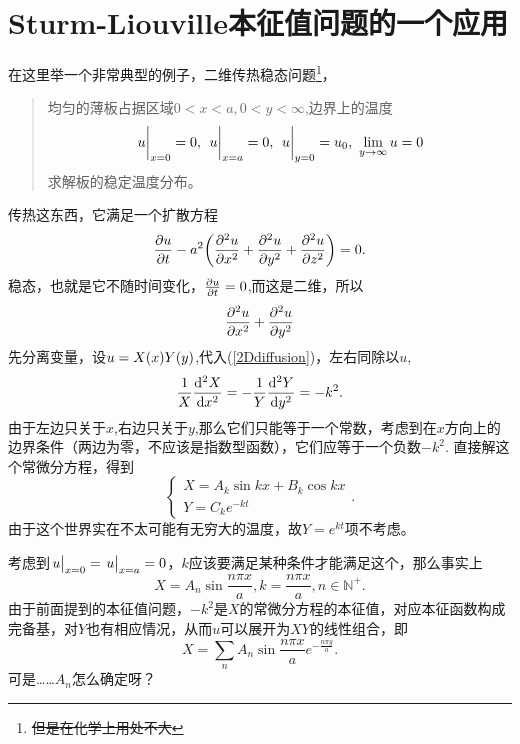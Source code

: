 \documentclass[12pt,a4paper,openany,twoside]{book}
\numberwithin{equation}{section}
\begin{document}
      \section{Sturm-Liouville本征值问题的一个应用}
        \label{sturm_Liouville_eigenvalue_problem_application}
        在这里举一个非常典型的例子，二维传热稳态问题\footnote{\sout{但是在化学上用处不大}}，
        \begin{quote}
          均匀的薄板占据区域$0<x<a,0<y<\infty$,边界上的温度
          \begin{equation*}
            \eval{u}_{x=0}=0,\ \eval{u}_{x=a}=0,\ \eval{u}_{y=0}=u_0,\ \lim_{y\to\infty}u=0
          \end{equation*} 
          求解板的稳定温度分布。
        \end{quote}
        传热这东西，它满足一个扩散方程
        \begin{equation}
          \pdv{u}{t}-a^2\qty(\pdv[2]{u}{x}+\pdv[2]{u}{y}+\pdv[2]{u}{z})=0.
        \end{equation}
        稳态，也就是它不随时间变化，$\pdv{u}{t}=0$,而这是二维，所以
        \begin{equation}
          \pdv[2]{u}{x}+\pdv[2]{u}{y}
          \label{2Ddiffusion}
        \end{equation}
        先分离变量，设$u=X\qty(x)Y\qty(y)$,代入(\ref{2Ddiffusion})，左右同除以$u$,
        \begin{equation}
          \frac{1}{X}\dv[2]{X}{x}=-\frac{1}{Y}\dv[2]{Y}{y}=-k^2.
        \end{equation}
        由于左边只关于$x$,右边只关于$y$,那么它们只能等于一个常数，考虑到在$x$方向上的边界条件（两边为零，不应该是指数型函数），它们应等于一个负数$-k^2$.
        直接解这个常微分方程，得到
        \begin{equation}
          \begin{cases}
            X = A_k\sin{kx} + B_k\cos{kx} \\
            Y = C_k e^{-kt}
          \end{cases}.
        \end{equation}
        由于这个世界实在不太可能有无穷大的温度，故$Y = e^{kt}$项不考虑。

        考虑到$\eval{u}_{x=0}=\eval{u}_{x=a}=0$，$k$应该要满足某种条件才能满足这个，那么事实上
        \begin{equation}
          X = A_n \sin{\frac{n\pi x}{a}} , k = \frac{n\pi x}{a}, n \in\mathbb{N}^+.
        \end{equation}
        由于前面提到的本征值问题，$-k^2$是$X$的常微分方程的本征值，对应本征函数构成完备基，对$Y$也有相应情况，从而$u$可以展开为$XY$的线性组合，即
        \begin{equation}
          X = \sum_n{A_n \sin{\frac{n\pi x}{a}} e^{- \frac{n\pi y}{a}}}.
        \end{equation}
        可是……$A_n$怎么确定呀？
        
\end{document}
